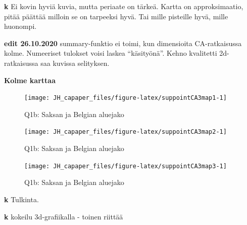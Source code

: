 \documentclass[
  finnish,
]{book}
\newenvironment{Shaded}{\begin{snugshade}}{\end{snugshade}}
\newcommand{\CommentTok}[1]{\textcolor[rgb]{0.56,0.35,0.01}{\textit{#1}}}
\newcommand{\DataTypeTok}[1]{\textcolor[rgb]{0.13,0.29,0.53}{#1}}
\newcommand{\DecValTok}[1]{\textcolor[rgb]{0.00,0.00,0.81}{#1}}
\newcommand{\KeywordTok}[1]{\textcolor[rgb]{0.13,0.29,0.53}{\textbf{#1}}}
\newcommand{\NormalTok}[1]{#1}
\newcommand{\OperatorTok}[1]{\textcolor[rgb]{0.81,0.36,0.00}{\textbf{#1}}}
\newcommand{\StringTok}[1]{\textcolor[rgb]{0.31,0.60,0.02}{#1}}
\begin{document}
\textbf{k} Ei kovin hyviä kuvia, mutta periaate on tärkeä. Kartta on approksimaatio,
pitää päättää milloin se on tarpeeksi hyvä. Tai mille pisteille hyvä, mille huonompi.

\textbf{edit 26.10.2020} summary-funktio ei toimi, kun dimensioita CA-ratkaisussa kolme.
Numeeriset tulokset voisi laskea ``käsityönä''. Kehno kvalitetti 2d-ratkaisussa saa
kuvissa selityksen.

\begin{Shaded}
\end{Shaded}

\textbf{Kolme karttaa}

\begin{figure}

{\centering \texttt{[image: JH\_capaper\_files/figure-latex/suppointCA3map1-1]} 

}

\caption{Q1b: Saksan ja  Belgian aluejako }\label{fig:suppointCA3map1}
\end{figure}

\begin{figure}

{\centering \texttt{[image: JH\_capaper\_files/figure-latex/suppointCA3map2-1]} 

}

\caption{Q1b: Saksan ja  Belgian aluejako }\label{fig:suppointCA3map2}
\end{figure}

\begin{figure}

{\centering \texttt{[image: JH\_capaper\_files/figure-latex/suppointCA3map3-1]} 

}

\caption{Q1b: Saksan ja  Belgian aluejako }\label{fig:suppointCA3map3}
\end{figure}

\textbf{k} Tulkinta.

\textbf{k} kokeilu 3d-grafiikalla - toinen riittää
\end{document}
